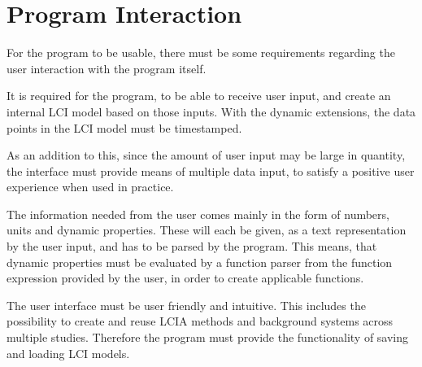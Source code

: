 \section{Program Interaction} \label{sec:Requirements-ProgramInteraction}
For the program to be usable, there must be some requirements regarding the user interaction with the program itself.

It is required for the program, to be able to receive user input, and create an internal LCI model based on those inputs. With the dynamic extensions, the data points in the LCI model must be timestamped.

As an addition to this, since the amount of user input may be large in quantity, the interface must provide means of multiple data input, to satisfy a positive user experience when used in practice.

The information needed from the user comes mainly in the form of numbers, units and dynamic properties. These will each be given, as a text representation by the user input, and has to be parsed by the program. This means, that dynamic properties must be evaluated by a function parser from the function expression provided by the user, in order to create applicable functions. 

The user interface must be user friendly and intuitive. This includes the possibility to create and reuse LCIA methods and background systems across multiple studies. Therefore the program must provide the functionality of saving and loading LCI models.